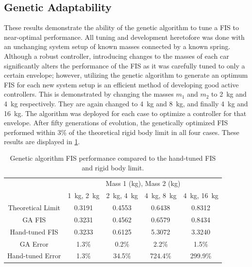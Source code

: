 \subsection{Genetic Adaptability} These results demonstrate the ability of the genetic algorithm to tune a FIS
to near-optimal performance. All tuning and development heretofore was done with an unchanging system setup of
known masses connected by a known spring. Although a robust controller\cite{cohen:01jgcd}, introducing changes
to the masses of each car significantly alters the performance of the FIS as it was carefully tuned to only a
certain envelope; however, utilizing the genetic algorithm to generate an optimum FIS for each new system
setup is an efficient method of developing good active controllers. This is demonstrated by changing the
masses $m_1$ and $m_2$ to \SI{2}{\kilogram} and \SI{4}{\kilogram} respectively. They are again changed to
\SI{4}{\kilogram} and \SI{8}{\kilogram}, and finally \SI{4}{\kilogram} and \SI{16}{\kilogram}. The algorithm
was deployed for each case to optimize a controller for that envelope. After fifty generations of evolution,
the genetically optimized FIS performed within 3\% of the theoretical rigid body limit in all four cases.
These results are displayed in \cref{tab:gacomp}.  \begin{table} \centering \caption{Genetic algorithm
    FIS performance compared to the hand-tuned FIS and rigid body limit.} \label{tab:gacomp}
    \begin{tabular}{|c|c|c|c|c|} \cline{2-5} \multicolumn{1}{c|}{} & \multicolumn{4}{|c|}{Mass 1
        (\si{\kilogram}), Mass 2 (\si{\kilogram})} \\\cline{2-5} \multicolumn{1}{c|}{} & \SI{1}{\kilogram},
        \SI{2}{\kilogram} & \SI{2}{\kilogram}, \SI{4}{\kilogram} & \SI{4}{\kilogram}, \SI{8}{\kilogram} &
        \SI{4}{\kilogram}, \SI{16}{\kilogram} \\\hline Theoretical Limit & 0.3191 & 0.4553 & 0.6438 & 0.8312
        \\\hline GA FIS & 0.3231 & 0.4562 & 0.6579 & 0.8434 \\\hline Hand-tuned FIS & 0.3233 & 0.6125 & 5.3072
                        & 3.3240 \\\hline\hline GA Error & \multicolumn{1}{|d|}{1.3\%} &
        \multicolumn{1}{|d|}{0.2\%} & \multicolumn{1}{|d|}{2.2\%} & \multicolumn{1}{|d|}{1.5\%} \\\hline
        Hand-tuned Error & \multicolumn{1}{|d|}{1.3\%} & \multicolumn{1}{|d|}{34.5\%} &
        \multicolumn{1}{|d|}{724.4\%} & \multicolumn{1}{|d|}{299.9\%} \\\hline \end{tabular} \end{table}

